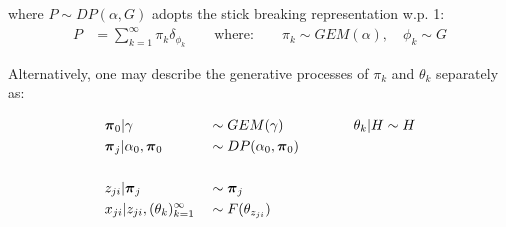 \documentclass{article} %
\begin{document}
where $P \sim DP(\alpha, G)$ adopts the stick breaking representation w.p. 1:
\begin{align*}
P &= \sum_{k=1}^\infty \pi_k \delta_{\phi_k} \qquad \mbox{where:}
\qquad
\pi_k \sim GEM(\alpha), \quad \phi_k  \sim G
\end{align*}

Alternatively, one may describe the generative processes of $\pi_k$ and $\theta_k$ separately as:

\begin{alignat*}{3}
& \boldsymbol{\pi}_0 | \gamma && \sim GEM(\gamma)
\qquad\qquad && \theta_k | H \sim H
\\
& \boldsymbol{\pi}_j | \alpha_0, \boldsymbol{\pi}_0 && \sim DP(\alpha_0, \boldsymbol{\pi}_0) \\ \\
& z_{ji} | \boldsymbol{\pi}_j && \sim \boldsymbol{\pi}_j \\
&
x_{ji} | z_{ji}, (\theta_{k})_{k=1}^\infty && \sim F(\theta_{z_{ji}})
\end{alignat*}
\end{document}

